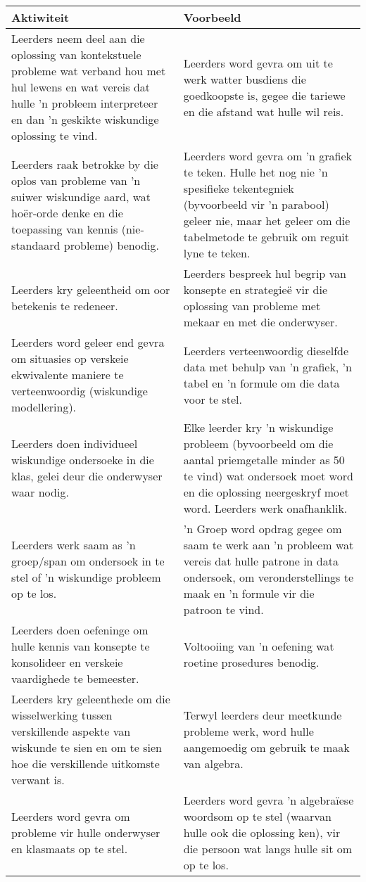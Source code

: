 \begin{table}[H]
  \begin{center}
    \begin{tabular}{|p{6.5cm}|p{6.5cm}|} \hline 
\textbf{Aktiwiteit} & \textbf{Voorbeeld} \\ \hline
Leerders neem deel aan die oplossing van kontekstuele probleme wat
verband hou met hul lewens en wat vereis dat hulle 'n probleem
interpreteer en dan 'n geskikte wiskundige oplossing te vind.
&
Leerders word gevra om uit te werk watter busdiens die goedkoopste is,
gegee die tariewe en die afstand wat hulle wil reis.
\\ \hline
Leerders raak betrokke by die oplos van probleme van 'n suiwer
wiskundige aard, wat ho\"{e}r-orde denke en die toepassing van kennis
(nie-standaard probleme) benodig.
&
Leerders word gevra om 'n grafiek te teken. Hulle het nog nie 'n
spesifieke tekentegniek (byvoorbeeld vir 'n parabool) geleer nie, maar
het geleer om die tabelmetode te gebruik om reguit lyne te teken.
\\ \hline
Leerders kry geleentheid om oor betekenis te redeneer.
&
Leerders bespreek hul begrip van konsepte en strategie\"{e} vir die
oplossing van probleme met mekaar en met die onderwyser.
\\ \hline
Leerders word geleer end gevra om situasies op verskeie ekwivalente
maniere te verteenwoordig (wiskundige modellering).
&
Leerders verteenwoordig dieselfde data met behulp van 'n grafiek, 'n
tabel en 'n formule om die data voor te stel.
\\ \hline
Leerders doen individueel wiskundige ondersoeke in die klas, gelei
deur die onderwyser waar nodig.
&
Elke leerder kry 'n wiskundige probleem (byvoorbeeld om die aantal
priemgetalle minder as 50 te vind) wat ondersoek moet word
en die oplossing neergeskryf moet word. Leerders werk onafhanklik.
\\ \hline
Leerders werk saam as 'n groep/span om ondersoek in te stel of 'n
wiskundige probleem op te los.
&
'n Groep word opdrag gegee om saam te werk aan 'n probleem wat vereis
dat hulle patrone in data ondersoek, om veronderstellings te maak en
'n ​​formule vir die patroon te vind.
\\ \hline
Leerders doen oefeninge om hulle kennis van konsepte
te konsolideer en verskeie vaardighede te bemeester.
&
Voltooiing van 'n oefening wat roetine prosedures benodig.
\\ \hline
Leerders kry geleenthede om die wisselwerking tussen verskillende
aspekte van wiskunde te sien en om te sien hoe die verskillende
uitkomste verwant is.
&
Terwyl leerders deur meetkunde probleme werk, word hulle aangemoedig
om gebruik te maak van algebra.
\\ \hline
Leerders word gevra om probleme vir hulle onderwyser en
klasmaats op te stel.
&
Leerders word gevra 'n algebra\"{i}ese woordsom op te stel
(waarvan hulle ook die oplossing ken), vir die persoon wat langs
hulle sit om op te los.
\\ \hline
    \end{tabular}
  \end{center}
\end{table}

